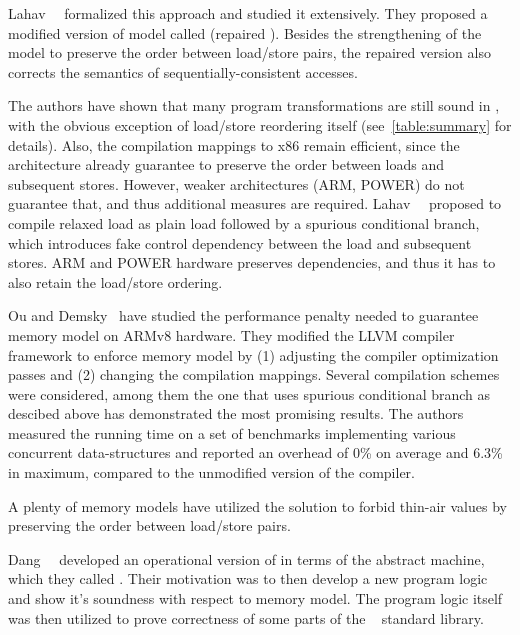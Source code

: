 Lahav~\etal~\cite{Lahav-al:PLDI17} formalized this approach and 
studied it extensively. They proposed a modified version 
of \CPP model called \RCMM (repaired \CMM).  
Besides the strengthening of the model to preserve 
the order between load/store pairs, 
the repaired version also corrects the semantics 
of sequentially-consistent accesses.

The authors have shown that many 
program transformations are still sound in \RCMM, 
with the obvious exception of load/store reordering itself
(see~\cref{table:summary} for details).
Also, the compilation mappings to x86 remain efficient, 
since the architecture already guarantee to preserve the order 
between loads and subsequent stores. 
However, weaker architectures (ARM, POWER) do not guarantee that, 
and thus additional measures are required.
Lahav~\etal~\cite{Lahav-al:PLDI17} proposed to compile relaxed load 
as plain load followed by a spurious conditional branch,
which introduces fake control dependency between 
the load and subsequent stores. 
ARM and POWER hardware preserves dependencies, 
and thus it has to also retain the load/store ordering. 

Ou and Demsky~\cite{Ou-Demsky:OOPSLA18} have studied 
the performance penalty needed to guarantee 
\RCMM memory model on ARMv8 hardware.
They modified the LLVM compiler framework 
to enforce \RCMM memory model
by (1) adjusting the compiler optimization passes and 
(2) changing the compilation mappings.
Several compilation schemes were considered,
among them the one that uses spurious conditional branch
as descibed above has demonstrated the most promising results.  
The authors measured the running time on a set of benchmarks 
implementing various concurrent data-structures
and reported an overhead of 0\% on average and 6.3\% in maximum,
compared to the unmodified version of the compiler. 

A plenty of memory models have utilized the \RCMM
solution to forbid thin-air values by 
preserving the order between load/store pairs. 

Dang~\etal~\cite{Dang-al:POPL19} developed an operational 
version of \RCMM in terms of the abstract machine, 
which they called \ORCMM. Their motivation was to 
then develop a new program logic and show it's soundness
with respect to \ORCMM memory model. 
The program logic itself was then utilized to 
prove correctness of some parts of 
the \Rust~\cite{RustBook:19} standard library.

